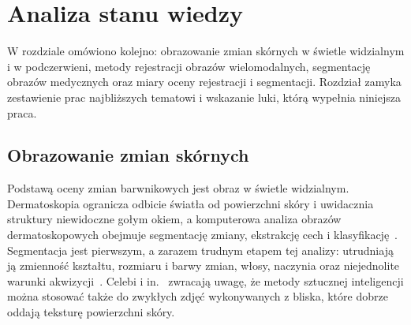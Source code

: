 
\chapter{Analiza stanu wiedzy}
\label{chap:stan-wiedzy}

W rozdziale omówiono kolejno: obrazowanie zmian skórnych w świetle widzialnym i w podczerwieni, metody rejestracji obrazów wielomodalnych, segmentację obrazów medycznych oraz miary oceny rejestracji i segmentacji. Rozdział zamyka zestawienie prac najbliższych tematowi i wskazanie luki, którą wypełnia niniejsza praca.

\section{Obrazowanie zmian skórnych}
\label{sec:obrazowanie}

Podstawą oceny zmian barwnikowych jest obraz w świetle widzialnym. Dermatoskopia ogranicza odbicie światła od powierzchni skóry i uwidacznia struktury niewidoczne gołym okiem, a komputerowa analiza obrazów dermatoskopowych obejmuje segmentację zmiany, ekstrakcję cech i klasyfikację~\cite{dermoscopy}. Segmentacja jest pierwszym, a zarazem trudnym etapem tej analizy: utrudniają ją zmienność kształtu, rozmiaru i barwy zmian, włosy, naczynia oraz niejednolite warunki akwizycji~\cite{dermoscopy}. Celebi i in.~\cite{dermoscopy} zwracają uwagę, że metody sztucznej inteligencji można stosować także do zwykłych zdjęć wykonywanych z bliska, które dobrze oddają teksturę powierzchni skóry.


